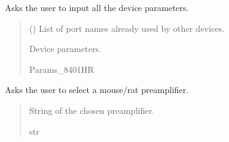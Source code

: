 \documentclass[letterpaper,10pt,english]{sphinxmanual}
\begin{document}
\begin{fulllineitems}
\begin{fulllineitems}
\label{\detokenize{Setup.SetupOneDevice:Setup.SetupOneDevice.Setup_8401HR.Setup8401HR._GetParam_onePODdevice}}
\pysigstartsignatures
{}
\pysigstopsignatures
\sphinxAtStartPar
Asks the user to input all the device parameters.
\begin{quote}\begin{description}
\sphinxAtStartPar
{} (\sphinxstyleliteralemphasis{\sphinxupquote{{[}}}\sphinxstyleliteralemphasis{\sphinxupquote{{]}}}) \textendash{} List of port names already used by other devices.

\sphinxAtStartPar
Device parameters.

\sphinxAtStartPar
Params\_8401HR

\end{description}\end{quote}

\end{fulllineitems}


\begin{fulllineitems}
\label{\detokenize{Setup.SetupOneDevice:Setup.SetupOneDevice.Setup_8401HR.Setup8401HR._GetPreampDeviceName}}
\pysigstartsignatures
{}
\pysigstopsignatures
\sphinxAtStartPar
Asks the user to select a mouse/rat preamplifier.
\begin{quote}\begin{description}
\sphinxAtStartPar
String of the chosen preamplifier.

\sphinxAtStartPar
str


\end{description}
\end{quote}
\end{fulllineitems}
\end{fulllineitems}
\end{document}
